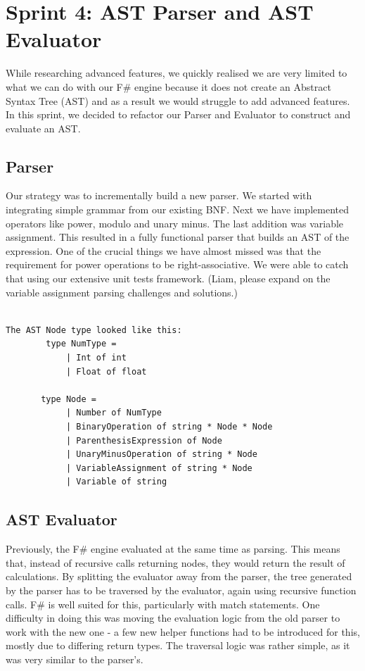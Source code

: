 \documentclass[a4paper, oneside, 11pt]{report}
\begin{document}
\section{Sprint 4: AST Parser and AST Evaluator}
While researching advanced features, we quickly realised we are very limited to what we can do with our F\# engine because it does not create an Abstract Syntax Tree (AST) and as a result we would struggle to add advanced features. In this sprint, we decided to refactor our Parser and Evaluator to construct and evaluate an AST.

\subsection{Parser}
Our strategy was to incrementally build a new parser. We started with integrating simple grammar from our existing BNF. Next we have implemented operators like power, modulo and unary minus. The last addition was variable assignment. This resulted in a fully functional parser that builds an AST of the expression. One of the crucial things we have almost missed was that the requirement for power operations to be right-associative. We were able to catch that using our extensive unit tests framework.
(Liam, please expand on the variable assignment parsing challenges and solutions.)
\begin{verbatim}
    
The AST Node type looked like this:
        type NumType =
            | Int of int
            | Float of float

       type Node =
            | Number of NumType
            | BinaryOperation of string * Node * Node
            | ParenthesisExpression of Node
            | UnaryMinusOperation of string * Node
            | VariableAssignment of string * Node
            | Variable of string
\end{verbatim}
\subsection{AST Evaluator}
Previously, the F\# engine evaluated at the same time as parsing. This means that, instead of recursive calls returning nodes, they would return the result of calculations. By splitting the evaluator away from the parser, the tree generated by the parser has to be traversed by the evaluator, again using recursive function calls. F\# is well suited for this, particularly with match statements.
One difficulty in doing this was moving the evaluation logic from the old parser to work with the new one - a few new helper functions had to be introduced for this, mostly due to differing return types. The traversal logic was rather simple, as it was very similar to the parser's.
\end{document}
